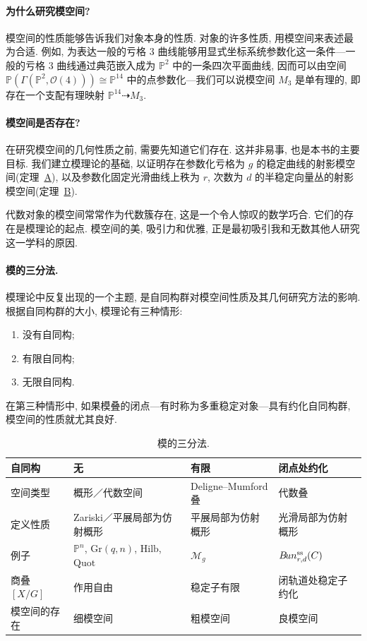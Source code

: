 \paragraph*{为什么研究模空间?} 模空间的性质能够告诉我们对象本身的性质. 对象的许多性质, 用模空间来表述最为合适. 例如, 为表达一般的亏格 $3$ 曲线能够用显式坐标系统参数化这一条件---一般的亏格 $3$ 曲线通过典范嵌入成为 $\mathbb P^2$ 中的一条四次平面曲线, 因而可以由空间 $\mathbb P(\Gamma(\mathbb P^2,\mathcal O(4)))\cong\mathbb P^{14}$ 中的点参数化---我们可以说模空间 $M_3$ 是单有理的, 即存在一个支配有理映射 $\mathbb P^{14}\dashrightarrow M_3$.

\paragraph*{模空间是否存在?} 在研究模空间的几何性质之前, 需要先知道它们存在. 这并非易事, 也是本书的主要目标. 我们建立模理论的基础, 以证明存在参数化亏格为 $g$ 的稳定曲线的射影模空间(定理~\hyperref[thm:A]{A}), 以及参数化固定光滑曲线上秩为 $r$, 次数为 $d$ 的半稳定向量丛的射影模空间(定理~\hyperref[thm:B]{B}).

代数对象的模空间常常作为代数簇存在, 这是一个令人惊叹的数学巧合. 它们的存在是模理论的起点. 模空间的美, 吸引力和优雅, 正是最初吸引我和无数其他人研究这一学科的原因.

\paragraph*{模的三分法.} 模理论中反复出现的一个主题, 是自同构群对模空间性质及其几何研究方法的影响. 根据自同构群的大小, 模理论有三种情形: 
\begin{enumerate}[(1)]
\item 没有自同构; 
\item 有限自同构; 
\item 无限自同构.
\end{enumerate}
在第三种情形中, 如果模叠的闭点---有时称为多重稳定对象---具有约化自同构群, 模空间的性质就尤其良好.
\begin{table}[htbp]
\centering\small
\begin{tabularx}{\textwidth}{@{}p{2.2cm}X X X@{}}
\toprule
自同构 & 无 & 有限 & 闭点处约化\\\midrule
空间类型 & 概形／代数空间 & Deligne--Mumford 叠 & 代数叠\\
定义性质 & Zariski／平展局部为仿射概形 & 平展局部为仿射概形 & 光滑局部为仿射概形\\
例子 & $\mathbb P^n$, $\mathrm{Gr}(q,n)$, $\mathrm{Hilb}$, $\mathrm{Quot}$ & $\mathcal M_g$ & $B\!un_{r,d}^{\mathrm{ss}}(C)$\\
商叠 $[X/G]$ & 作用自由 & 稳定子有限 & 闭轨道处稳定子约化\\
模空间的存在 & 细模空间 & 粗模空间 & 良模空间\\\bottomrule
\end{tabularx}
\caption{模的三分法.}\label{src:1.0.1}
\end{table}

